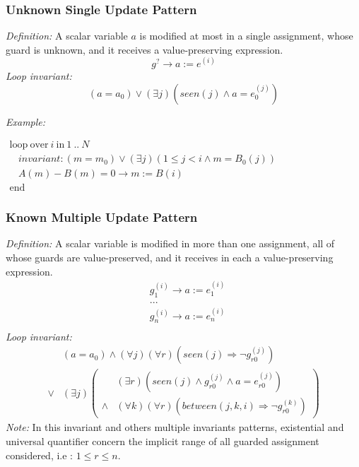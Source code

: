 \documentclass[a4paper,10pt]{article}
\newcommand{\idx}{\ensuremath{i}\xspace}
\newcommand{\at}[1]{{(#1)}}
\newcommand{\KWloop}{\ensuremath{\mathrm{loop}~}}
\newcommand{\KWend}{\ensuremath{\mathrm{end}~}}
\newcommand{\KWover}{\ensuremath{\mathrm{over}~}}
\newcommand{\KWin}{\ensuremath{~\mathrm{in}~}}
\newcommand{\impl}{\ensuremath{\Longrightarrow}}
\newcommand{\seen}[1]{\ensuremath{\mathit{seen}(#1)}\xspace}
\newcommand{\between}[3]{\ensuremath{\mathit{between}{(#1,#2,#3)}}\xspace}
\newcommand{\loopinvariant}{\noindent\textit{Loop invariant:}\xspace}
\newcommand{\patterndef}{\noindent\textit{Definition:}\xspace}
\newcommand{\patternexample}{\noindent\textit{Example:}\xspace}
\newcommand{\patternnote}{\noindent\textit{Note:}\xspace}
\begin{document}
\subsubsection*{Unknown Single Update Pattern}

\patterndef A scalar variable $a$ is modified at most in a single assignment, whose
guard is unknown, and it receives a value-preserving expression.
%
$$g^? \rightarrow a := e^\at{\idx}$$
%
\loopinvariant
%
$$(a = a_0) \lor (\exists j)(\seen{j} \land a = e_0^\at{j})$$

\bigskip
\patternexample

\medskip
$\begin{array}{l}
  \KWloop \KWover i \KWin 1~..~N \\
  ~~~~ \textit{invariant}: (m = m_0) \lor (\exists j)(1\leq j < i \land m = B_0(j))\\
  ~~~~ A(m)-B(m)=0 \rightarrow m := B(i)\\
  \KWend
\end{array}$

\subsubsection*{Known Multiple Update Pattern}

\patterndef A scalar variable is modified in more than one assignment, all of
whose guards are value-preserved, and it receives in each a value-preserving expression.
%
\begin{eqnarray*}
&g_1^\at{\idx} \rightarrow a := e_1^\at{\idx}\\
&...\\
&g_n^\at{\idx} \rightarrow a := e_n^\at{\idx}\\
\end{eqnarray*}
%
\loopinvariant
%
\begin{eqnarray*}
&(a = a_0) \land (\forall j)(\forall r)(\seen{j} \impl \neg g_{r0}^\at{j})\\
\lor 
& (\exists j)
\left(\begin{array}{cl}
&(\exists r)(\seen{j} \land g_{r0}^\at{j} \land a = e_{r0}^\at{j})\\
\land&  (\forall k)(\forall r) (\between{j}{k}{\idx} \impl \neg g_{r0}^\at{k})
\end{array}\right)
\end{eqnarray*}
%
\patternnote In this invariant and others multiple invariants patterns, 
existential and universal quantifier concern the implicit range of all 
guarded assignment considered, i.e : $1 \leq r \leq n$.
\end{document}
